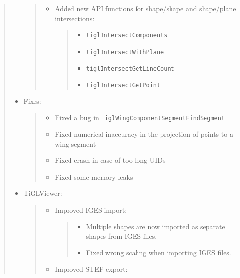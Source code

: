 \documentclass[]{scrartcl}
\begin{document}
\begin{quote}
\begin{itemize}
  \begin{quote}
  \begin{itemize}
  \item
    Added new API functions for shape/shape and shape/plane
    intersections:

    \begin{quote}
    \begin{itemize}
    \itemsep1pt\parskip0pt
    \item
      \texttt{tiglIntersectComponents}
    \item
      \texttt{tiglIntersectWithPlane}
    \item
      \texttt{tiglIntersectGetLineCount}
    \item
      \texttt{tiglIntersectGetPoint}
    \end{itemize}
    \end{quote}
  \end{itemize}
  \end{quote}
\item
  Fixes:

  \begin{quote}
  \begin{itemize}
  \itemsep1pt\parskip0pt
  \item
    Fixed a bug in \texttt{tiglWingComponentSegmentFindSegment}
  \item
    Fixed numerical inaccuracy in the projection of points to a wing
    segment
  \item
    Fixed crash in case of too long UIDs
  \item
    Fixed some memory leaks
  \end{itemize}
  \end{quote}
\item
  TiGLViewer:

  \begin{quote}
  \begin{itemize}
  \item
    Improved IGES import:

    \begin{quote}
    \begin{itemize}
    \itemsep1pt\parskip0pt
    \item
      Multiple shapes are now imported as separate shapes from IGES
      files.
    \item
      Fixed wrong scaling when importing IGES files.
    \end{itemize}
    \end{quote}
  \item
    Improved STEP export:


\end{itemize}
\end{quote}
\end{itemize}
\end{quote}
\end{document}
